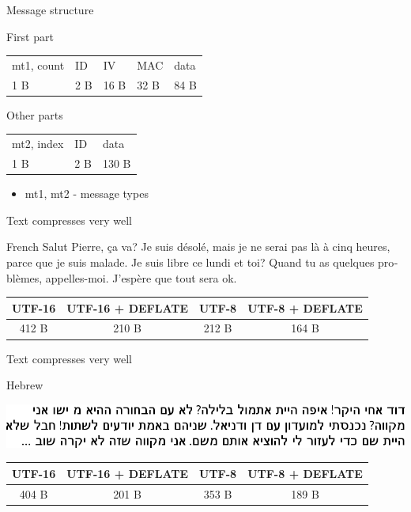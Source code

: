 \documentclass{beamer}
\newcommand{\txtTextCompression}{Text compresses very well}
\newcommand{\verticalspace}{\vspace{10pt}}
\begin{document}
\begin{frame}{Message structure}
	\begin{block}{First part}
		\verticalspace
		\begin{tabularx}{\textwidth}{ |l|l|l|l|L| }
			\hline
			mt1, count  & ID      & IV   & MAC & data \\
			1 B         & 2 B     & 16 B & 32 B & 84 B  \\
			\hline
		\end{tabularx}
	\end{block}

	\begin{block}{Other parts}
		\verticalspace
		\begin{tabularx}{\textwidth}{ |l|l|L| }
			\hline
			mt2, index  & ID   & data \\
			1 B         & 2 B     & 130 B  \\
			\hline
		\end{tabularx}
	\end{block}
	
	\begin{itemize}
		\item{mt1, mt2 - message types}
	\end{itemize}
\end{frame}

\begin{frame}{\txtTextCompression}
	\begin{exampleblock}{French}
		\foreignlanguage{french}{Salut Pierre, {\c c}a va? Je suis désolé, mais je ne serai pas là à cinq heures, parce que je suis malade. Je suis libre ce lundi et toi? Quand tu as quelques problèmes, appelles-moi. J'espère que tout sera ok.}

		\verticalspace
		\centering
		\begin{tabular}{ |c|c|c|c| }
			\hline
			UTF-16 & UTF-16 + DEFLATE & UTF-8 & UTF-8 + DEFLATE \\
			\hline
			412 B & 210 B & 212 B & 164 B \\
			\hline
		\end{tabular}
	\end{exampleblock}
\end{frame}

\begin{frame}{\txtTextCompression}
	\begin{exampleblock}{Hebrew}
		\begin{flushright}
			\includegraphics[width=\textwidth]{hebrew}
		\end{flushright}
		\centering
		\begin{tabular}{ |c|c|c|c| }
			\hline
			UTF-16 & UTF-16 + DEFLATE & UTF-8 & UTF-8 + DEFLATE \\
			\hline
			404 B & 201 B & 353 B & 189 B \\
			\hline
		\end{tabular}
	\end{exampleblock}
\end{frame}
\end{document}

